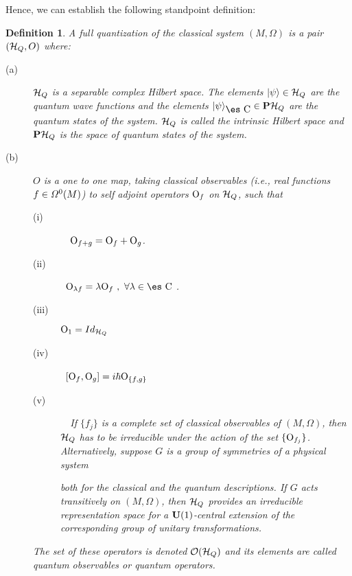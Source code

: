 \documentclass[12pt]{article}
\theoremstyle{plain}
\newtheorem{definition}{Definition}
\def\H{{\cal H}}
\def\sta{|\psi \rangle }
\def\Op{{\rm O}}
\def\Complex{\mbox{\es C}}
\begin{document}
Hence, we can establish the following standpoint definition:

\begin{definition}
A {\rm full quantization} of the classical system $(M,\Omega )$
is a pair $(\H_Q,O)$ where:
\begin{description}
\item[{\rm (a)}]
$\H_Q$ is a separable complex Hilbert space.
The elements $\sta \in \H_Q$ are the {\rm quantum wave functions}
and the elements $\sta_{\Complex} \in {\bf P}\H_Q$
are the {\rm quantum states} of the system. $\H_Q$ is called the
{\rm intrinsic Hilbert space} and ${\bf P}\H_Q$ is the
{\rm space of quantum states} of the system.
\item[{\rm (b)}]
$O$ is a one to one map, taking classical observables
(i.e., real functions $f \in {\mit\Omega}^0(M)$) to self adjoint
operators
$\Op_f$ on $\H_Q$, such that
\begin{description}
\item[{\rm (i)}] \ \
$\Op_{f+g} =\Op_f+\Op_g$.
\item[{\rm (ii)}] \
$\Op_{\lambda f} = \lambda \Op_f \ , \
\forall \lambda \in \Complex$ .
\item[{\rm (iii)}]
$\Op_1 = Id_{\H_Q}$
\item[{\rm (iv)}] \
$[\Op_f,\Op_g] = i \hbar \Op_{\{ f,g \}}$
\item[{\rm (v)}] \ \
If $\{ f_j \}$ is a complete set of classical observables
of $(M,\Omega )$, then $\H_Q$ has to be irreducible
under the action of the set $\{ \Op_{f_j} \}$.
Alternatively, suppose $G$ is a group of symmetries of a physical system

both for the classical and the quantum descriptions.
If $G$ acts transitively on $(M, \Omega )$,
then $\H_Q$ provides an irreducible representation space
for a ${\bf U}(1)$-central extension of the corresponding
group of unitary transformations.
\end{description}
The set of these operators is denoted ${\cal O}(\H_Q)$
and its elements are called {\rm quantum observables} or {\rm quantum
operators}.
\end{description}
\label{fquan}
\end{definition}
\end{document}
